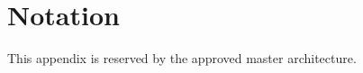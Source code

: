 \chapter{Notation}
\label{app:notation}

This appendix is reserved by the approved master architecture.
